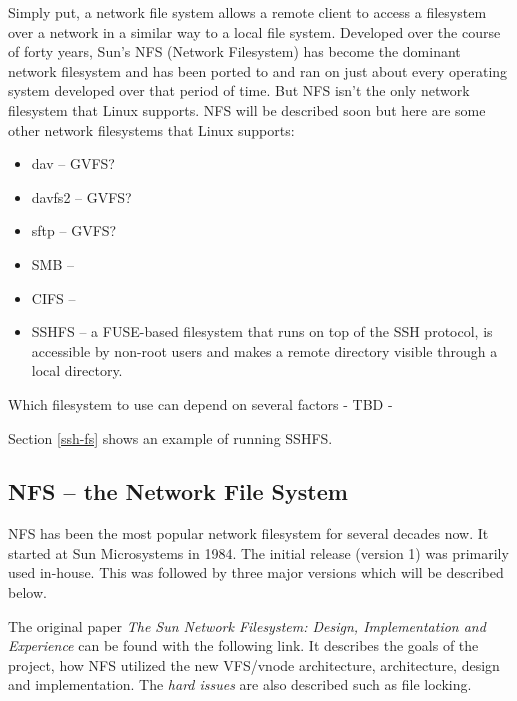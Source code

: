 
Simply put, a network file system allows a remote client to access a filesystem over a network in a similar way to a local file system. Developed over the course of forty years, Sun's NFS (Network Filesystem) has become the dominant network filesystem and has been ported to and ran on just about every operating system developed over that period of time. But NFS isn't the only network filesystem that Linux supports. NFS will be described soon but here are some other network filesystems that Linux supports:


\begin{itemize}
	\item dav -- GVFS?
	\item davfs2 -- GVFS?
	\item sftp -- GVFS?
	\item SMB -- 
	\item CIFS -- 
	\item SSHFS -- a FUSE-based filesystem that runs on top of the SSH protocol, is accessible by non-root users and makes
		a remote directory visible through a local directory. 
\end{itemize}

\noindent
Which filesystem to use can depend on several factors - TBD - %

Section \ref{ssh-fs} shows an example of running SSHFS.

\subsection{NFS -- the Network File System}

NFS has been the most popular network filesystem for several decades now. It started at Sun Microsystems in 1984. The initial release (version 1) was primarily used in-house. This was followed by three major versions which will be described below.

The original paper \textit{The Sun Network Filesystem: Design, Implementation and Experience} can be found with the following link. It describes the goals of the project, how NFS utilized the new VFS/vnode architecture, architecture, design and implementation. The \textit{hard issues} are also described such as file locking.

